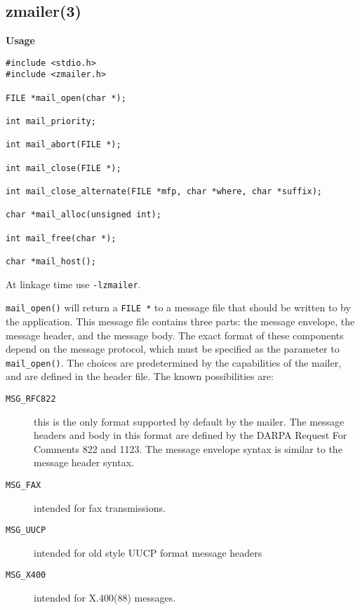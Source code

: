 \subsection{zmailer(3)}

{\bf Usage}
\begin{tscreen}
\begin{verbatim}
#include <stdio.h>
#include <zmailer.h>

FILE *mail_open(char *);

int mail_priority;

int mail_abort(FILE *);

int mail_close(FILE *);

int mail_close_alternate(FILE *mfp, char *where, char *suffix);

char *mail_alloc(unsigned int);

int mail_free(char *);

char *mail_host();
\end{verbatim}
\end{tscreen}


At linkage time use {\tt -lzmailer}.

{\tt mail\_open()} will return a {\tt FILE *} to a message
file that should be written to by the application. This
message file contains three parts: the message envelope,
the message header, and the message body. The exact format of
these components depend on the message protocol,
which must be specified as the parameter to {\tt mail\_open()}.
The choices are predetermined by the capabilities of the
mailer, and are defined in the header file. The known
possibilities are:

\begin{description}
\item[ {\tt MSG\_RFC822}] \mbox{}

this is the only format supported 
by default by the mailer. The message headers and body in this format
are defined by the DARPA Request For Comments 822 and 1123. 
The message envelope syntax is similar to the message header syntax.



\item[ {\tt MSG\_FAX}] \mbox{}

intended for fax transmissions.



\item[ {\tt MSG\_UUCP}] \mbox{}

intended for old style UUCP format message headers



\item[ {\tt MSG\_X400}] \mbox{}

intended for X.400(88) messages.

\end{description}


